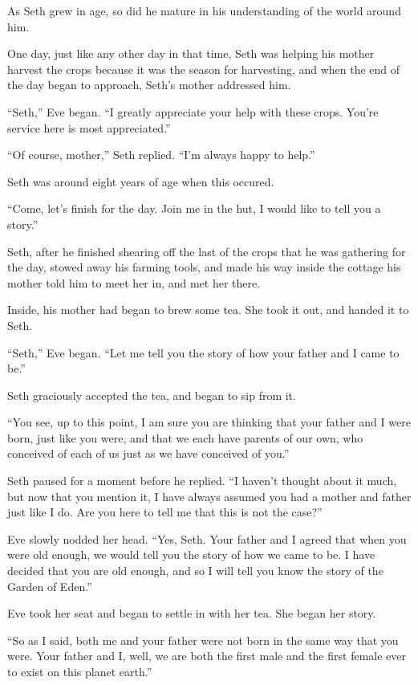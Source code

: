 \documentclass[12pt,twoside,titlepage]{report}
\begin{document}
As Seth grew in age, so did he mature in his understanding of the world
around him.

One day, just like any other day in that time, Seth was helping his
mother harvest the crops because it was the season for harvesting, and
when the end of the day began to approach, Seth's mother addressed him.

``Seth,'' Eve began. ``I greatly appreciate your help with these crops.
You're service here is most appreciated.''

``Of course, mother,'' Seth replied. ``I'm always happy to help.''

Seth was around eight years of age when this occured.

``Come, let's finish for the day. Join me in the hut, I would like to
tell you a story.''

Seth, after he finished shearing off the last of the crops that he was
gathering for the day, stowed away his farming tools, and made his way
inside the cottage his mother told him to meet her in, and met her
there.

Inside, his mother had began to brew some tea. She took it out, and
handed it to Seth.

``Seth,'' Eve began. ``Let me tell you the story of how your father and
I came to be.''

Seth graciously accepted the tea, and began to sip from it.

``You see, up to this point, I am sure you are thinking that your father
and I were born, just like you were, and that we each have parents of
our own, who conceived of each of us just as we have conceived of you.''

Seth paused for a moment before he replied. ``I haven't thought about it
much, but now that you mention it, I have always assumed you had a
mother and father just like I do. Are you here to tell me that this is
not the case?''

Eve slowly nodded her head. ``Yes, Seth. Your father and I agreed that
when you were old enough, we would tell you the story of how we came to
be. I have decided that you are old enough, and so I will tell you know
the story of the Garden of Eden.''

Eve took her seat and began to settle in with her tea. She began her
story.

``So as I said, both me and your father were not born in the same way
that you were. Your father and I, well, we are both the first male and
the first female ever to exist on this planet earth.''
\end{document}

